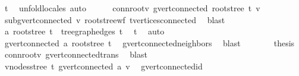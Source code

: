 \begin{isabellebody}
\ t\ \isamarkupfalse%
\ unfold{\isacharunderscore}{\kern0pt}locales\ auto\isanewline
\ \ \ \ \isamarkupfalse%
\ conn{\isacharunderscore}{\kern0pt}root{\isacharunderscore}{\kern0pt}v{\isacharcolon}{\kern0pt}\ {\isachardoublequoteopen}g{\isachardot}{\kern0pt}vert{\isacharunderscore}{\kern0pt}connected\ {\isacharparenleft}{\kern0pt}root{\isacharunderscore}{\kern0pt}stree\ t{\isacharparenright}{\kern0pt}\ v{\isachardoublequoteclose}\ \isamarkupfalse%
\ subg{\isachardot}{\kern0pt}vert{\isacharunderscore}{\kern0pt}connected\ v\ root{\isacharunderscore}{\kern0pt}stree{\isacharunderscore}{\kern0pt}wf\ t{\isachardot}{\kern0pt}vertices{\isacharunderscore}{\kern0pt}connected\ \isamarkupfalse%
\ blast\isanewline
\ \ \ \ \isamarkupfalse%
\ {\isachardoublequoteopen}{\isacharbraceleft}{\kern0pt}a{\isacharcomma}{\kern0pt}\ root{\isacharunderscore}{\kern0pt}stree\ t{\isacharbraceright}{\kern0pt}\ {\isasymin}\ tree{\isacharunderscore}{\kern0pt}graph{\isacharunderscore}{\kern0pt}edges\ {\isacharquery}{\kern0pt}t{\isachardoublequoteclose}\ \isamarkupfalse%
\ t\ \isamarkupfalse%
\ auto\isanewline
\ \ \ \ \isamarkupfalse%
\ \isamarkupfalse%
\ {\isachardoublequoteopen}g{\isachardot}{\kern0pt}vert{\isacharunderscore}{\kern0pt}connected\ a\ {\isacharparenleft}{\kern0pt}root{\isacharunderscore}{\kern0pt}stree\ t{\isacharparenright}{\kern0pt}{\isachardoublequoteclose}\ \isamarkupfalse%
\ g{\isachardot}{\kern0pt}vert{\isacharunderscore}{\kern0pt}connected{\isacharunderscore}{\kern0pt}neighbors\ \isamarkupfalse%
\ blast\isanewline
\ \ \ \ \isamarkupfalse%
\ \isamarkupfalse%
\ {\isacharquery}{\kern0pt}thesis\ \isamarkupfalse%
\ conn{\isacharunderscore}{\kern0pt}root{\isacharunderscore}{\kern0pt}v\ g{\isachardot}{\kern0pt}vert{\isacharunderscore}{\kern0pt}connected{\isacharunderscore}{\kern0pt}trans\ \isamarkupfalse%
\ blast\isanewline
\ \ \isamarkupfalse%
\isanewline
\ \ \isamarkupfalse%
\ \isamarkupfalse%
\ {\isachardoublequoteopen}{\isasymforall}v{\isasymin}nodes{\isacharunderscore}{\kern0pt}stree\ {\isacharquery}{\kern0pt}t{\isachardot}{\kern0pt}\ g{\isachardot}{\kern0pt}vert{\isacharunderscore}{\kern0pt}connected\ a\ v{\isachardoublequoteclose}\ \isamarkupfalse%
\ g{\isachardot}{\kern0pt}vert{\isacharunderscore}{\kern0pt}connected{\isacharunderscore}{\kern0pt}id\ \isamarkupfalse%

\end{isabellebody}
